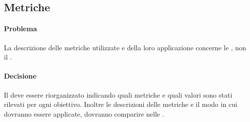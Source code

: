 \subsection{Metriche}
\paragraph{Problema} La descrizione delle metriche utilizzate e della loro applicazione concerne le \NP, non il \PQ.
\paragraph{Decisione} Il \PQ deve essere riorganizzato indicando quali metriche e quali valori sono stati rilevati per ogni obiettivo. Inoltre le descrizioni delle metriche e il modo in cui dovranno essere applicate, dovranno comparire nelle \NP.
